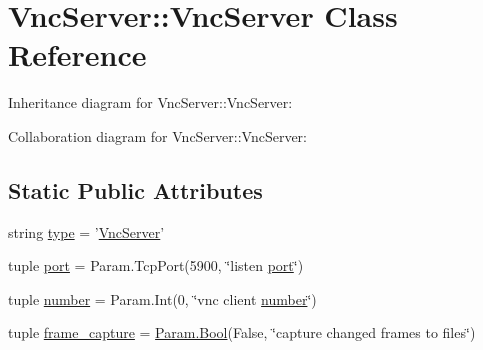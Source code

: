 \hypertarget{classVncServer_1_1VncServer}{
\section{VncServer::VncServer Class Reference}
\label{classVncServer_1_1VncServer}
}


Inheritance diagram for VncServer::VncServer:


Collaboration diagram for VncServer::VncServer:
\subsection*{Static Public Attributes}
\begin{DoxyCompactItemize}
\item 
string \hyperlink{classVncServer_1_1VncServer_a18b1167e6c0414f5bbe76116e29e81c8}{type} = '\hyperlink{classVncServer_1_1VncServer}{VncServer}'
\item 
tuple \hyperlink{classVncServer_1_1VncServer_acd53d0ea3e4e1a0f99372c165be452c5}{port} = Param.TcpPort(5900, \char`\"{}listen \hyperlink{classport}{port}\char`\"{})
\item 
tuple \hyperlink{classVncServer_1_1VncServer_a04d2358b5b6b9071d763987c65ffc42a}{number} = Param.Int(0, \char`\"{}vnc client \hyperlink{classVncServer_1_1VncServer_a04d2358b5b6b9071d763987c65ffc42a}{number}\char`\"{})
\item 
tuple \hyperlink{classVncServer_1_1VncServer_ae12ce7ac563c8d2605be5bb314695293}{frame\_\-capture} = \hyperlink{sqlite3_8c_a2f520588d7cfd47c237231e103dbeb78}{Param.Bool}(False, \char`\"{}capture changed frames to files\char`\"{})
\end{DoxyCompactItemize}



